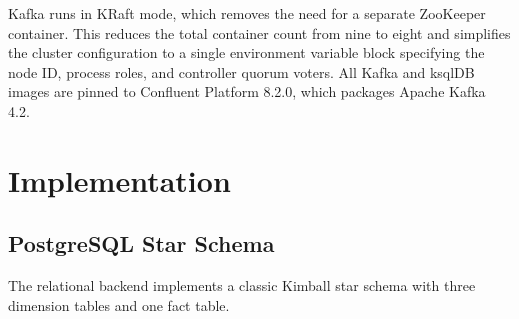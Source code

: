 \documentclass[12pt,a4paper]{article}
\begin{document}
Kafka runs in KRaft mode, which removes the need for a separate ZooKeeper container. This reduces the total container count from nine to eight and simplifies the cluster configuration to a single environment variable block specifying the node ID, process roles, and controller quorum voters. All Kafka and ksqlDB images are pinned to Confluent Platform 8.2.0, which packages Apache Kafka 4.2.


\section{Implementation}
\label{sec:implementation}

\subsection{PostgreSQL Star Schema}

The relational backend implements a classic Kimball star schema with three dimension tables and one fact table.
\end{document}
